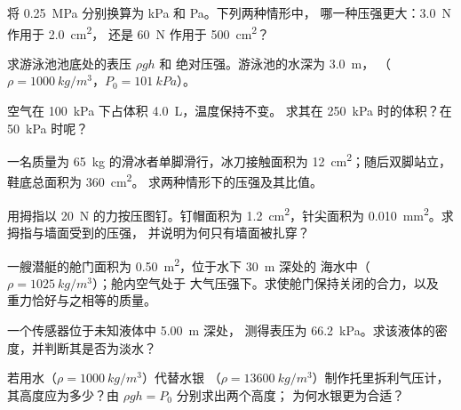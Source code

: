 \begin{exercise}[$\star$]\label{exo:g10:pressure:2}
将 \qty{0.25}{MPa} 分别换算为 \unit{kPa} 和 \unit{Pa}。下列两种情形中，
哪一种压强更大：\qty{3.0}{N} 作用于 \qty{2.0}{cm^2}，
还是 \qty{60}{N} 作用于 \qty{500}{cm^2}？
\end{exercise}

\begin{exercise}[$\star$]\label{exo:g10:pressure:3}
求游泳池池底处的表压 $\rho g h$ 和
绝对压强。游泳池的水深为 \qty{3.0}{m}，
（$\rho = \qty{1000}{kg/m^3}$，$P_0 = \qty{101}{kPa}$）。
\end{exercise}

\begin{exercise}[$\star$]\label{exo:g10:pressure:4}
空气在 \qty{100}{kPa} 下占体积 \qty{4.0}{L}，温度保持不变。
求其在 \qty{250}{kPa} 时的体积？在 \qty{50}{kPa} 时呢？
\end{exercise}

\begin{exercise}[$\star$]\label{exo:g10:pressure:5}
一名质量为 \qty{65}{kg} 的滑冰者单脚滑行，冰刀接触面积为
\qty{12}{cm^2}；随后双脚站立，鞋底总面积为 \qty{360}{cm^2}。
求两种情形下的压强及其比值。
\end{exercise}

\begin{exercise}[$\star\star$]\label{exo:g10:pressure:6}
用拇指以 \qty{20}{N} 的力按压图钉。钉帽面积为
\qty{1.2}{cm^2}，针尖面积为 \qty{0.010}{mm^2}。求拇指与墙面受到的压强，
并说明为何只有墙面被扎穿？
\end{exercise}

\begin{exercise}[$\star\star$]\label{exo:g10:pressure:7}
一艘潜艇的舱门面积为 \qty{0.50}{m^2}，位于水下 \qty{30}{m} 深处的
海水中（$\rho = \qty{1025}{kg/m^3}$）；舱内空气处于
大气压强下。求使舱门保持关闭的合力，以及
重力恰好与之相等的质量。
\end{exercise}

\begin{exercise}[$\star\star$]\label{exo:g10:pressure:8}
一个传感器位于未知液体中 \qty{5.00}{m} 深处，
测得表压为 \qty{66.2}{kPa}。求该液体的密度，并判断其是否为淡水？
\end{exercise}

\begin{exercise}[$\star\star$]\label{exo:g10:pressure:9}
若用水（$\rho = \qty{1000}{kg/m^3}$）代替水银
（$\rho = \qty{13600}{kg/m^3}$）制作托里拆利气压计，
其高度应为多少？由 $\rho g h = P_0$ 分别求出两个高度；
为何水银更为合适？
\end{exercise}

